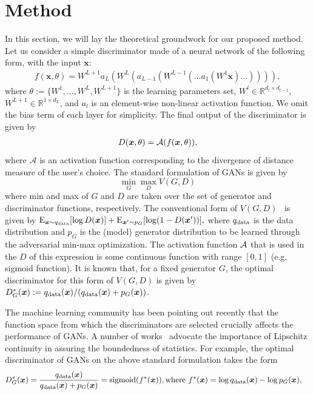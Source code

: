 \documentclass{article}
\newcommand{\bbR}{\mathbb{R}}
\newcommand{\bmx}{{\bm x}}
\begin{document}
\section{Method}
In this section, we will lay the theoretical groundwork for our proposed method.
Let us consider a simple discriminator made of a neural network of the following form, with the input $\bmx$:
\begin{align}
	f(\bmx, \theta) = W^{L+1} a_L (W^L (a_{L-1}(W^{L-1}(\dots a_1(W^1\bmx)\dots)))),
\end{align}
where $\theta:=\{W^1,\dots, W^L, W^{L+1} \}$ is the learning parameters set, $W^l\in \bbR^{d_l \times d_{l-1}}$, $W^{L+1}\in \bbR^{1\times{d_L}}$, and $a_l$ is an element-wise non-linear activation function. We omit the bias term of each layer for simplicity.
The final output of the discriminator is given by
\begin{align}
	D(\bmx, \theta) =  {\rm \mathcal{A}}(f(\bmx, \theta)),
\end{align}
where $\mathcal{A}$ is an activation function corresponding to the divergence of distance measure of the user's choice.
The standard formulation of GANs is given by
$$\min_{G} \max_{D} V(G, D)$$
where min and max of $G$ and $D$ are taken over the set of generator and discriminator functions, respectively.
The conventional form of $V(G,D)$~\cite[]{goodfellow2014generative} is given by
$\mathrm{E}_{\bmx\sim q_{\rm data}} [\log D(\bmx)] + \mathrm{E}_{\bmx'\sim p_G} [\log(1-D(\bmx'))], \label{eq:stdgan}$
where $q_{\rm data}$ is the data distribution and $p_G$ is the (model) generator distribution to be learned through the adversarial min-max optimization.
The activation function ${\rm \mathcal{A}}$ that is used in the $D$ of this expression is some continuous function with range $[0,1]$ (e.g, sigmoid function).
It is known that, for a fixed generator $G$, the optimal discriminator for this form of $V(G,D)$ is given by $D^*_G(\bmx) := q_{\rm data}(\bmx)/(q_{\rm data}(\bmx) + p_{G}(\bmx))$.

The machine learning community has been pointing out recently that the function space from which the discriminators are selected crucially affects the performance of GANs.
A number of works~\cite[]{uehara2016generative, qi2017loss, gulrajani2017improved} advocate the importance of Lipschitz continuity in assuring the boundedness of statistics.
For example, the optimal discriminator of GANs on the above standard formulation takes the form
\begin{align}
	D_{G}^*(\bmx) & = \frac{q_{\rm data}(\bmx)}{q_{\rm data}(\bmx)+p_G(\bmx)} = {\rm sigmoid}(f^*(\bmx)),
	\text{where }f^*(\bmx) = \log q_{\rm data}(\bmx) - \log p_G(\bmx),
\end{align}
\end{document}
